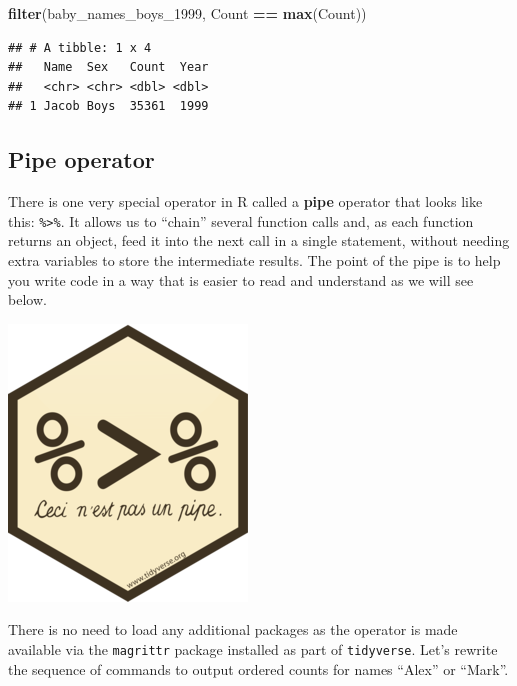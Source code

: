 \documentclass[
]{book}
\newenvironment{Shaded}{\begin{snugshade}}{\end{snugshade}}
\newcommand{\DecValTok}[1]{\textcolor[rgb]{0.00,0.00,0.81}{#1}}
\newcommand{\KeywordTok}[1]{\textcolor[rgb]{0.13,0.29,0.53}{\textbf{#1}}}
\newcommand{\NormalTok}[1]{#1}
\newcommand{\OperatorTok}[1]{\textcolor[rgb]{0.81,0.36,0.00}{\textbf{#1}}}
\newcommand{\StringTok}[1]{\textcolor[rgb]{0.31,0.60,0.02}{#1}}
\begin{document}
\begin{alert}
\begin{enumerate}
\begin{Shaded}
\begin{Highlighting}[]
\KeywordTok{filter}\NormalTok{(baby\_names\_boys\_}\DecValTok{1999}\NormalTok{, Count }\OperatorTok{==}\StringTok{ }\KeywordTok{max}\NormalTok{(Count))}
\end{Highlighting}
\end{Shaded}

\begin{verbatim}
## # A tibble: 1 x 4
##   Name  Sex   Count  Year
##   <chr> <chr> <dbl> <dbl>
## 1 Jacob Boys  35361  1999
\end{verbatim}
\end{enumerate}

\end{alert}

\hypertarget{pipe-operator}{%
\subsection{Pipe operator}\label{pipe-operator}}

There is one very special operator in R called a \textbf{pipe} operator that
looks like this: \texttt{\%\textgreater{}\%}. It allows us to ``chain'' several function calls and,
as each function returns an object, feed it into the next call in a single
statement, without needing extra variables to store the intermediate
results. The point of the pipe is to help you write code in a way that is
easier to read and understand as we will see below.

\includegraphics{R/Rintro/images/magrittr.png}

There is no need to load any additional packages as the operator is made
available via the \texttt{magrittr} package installed as part of \texttt{tidyverse}. Let's
rewrite the sequence of commands to output ordered counts for names
``Alex'' or ``Mark''.
\end{document}
